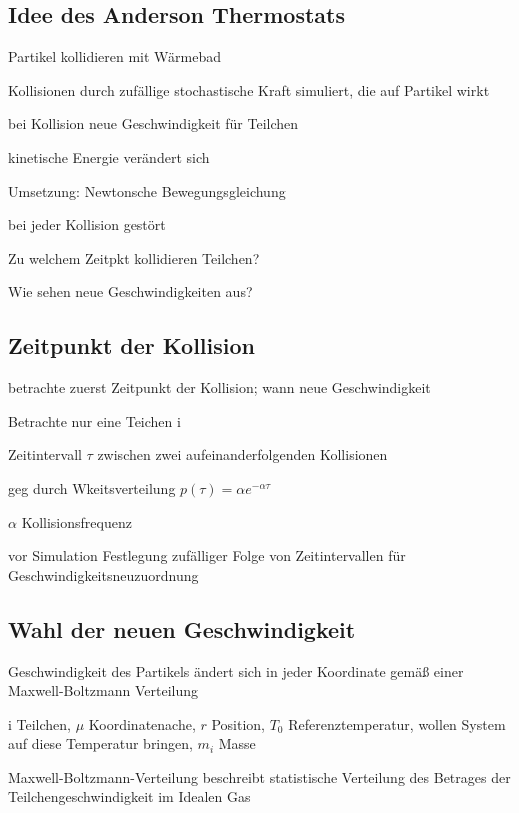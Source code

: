 \documentclass[twocolumn]{article}
\let\tempone\itemize
\let\temptwo\enditemize
\renewenvironment{itemize}{\tempone\addtolength{\itemsep}{-.5\baselineskip}}{\temptwo}
\begin{document}
\subsection{Idee des Anderson Thermostats}
	\begin{itemize}
		\item Partikel kollidieren mit Wärmebad
		\item Kollisionen durch zufällige stochastische Kraft simuliert, die auf Partikel wirkt
		\item bei Kollision neue Geschwindigkeit für Teilchen
		\item kinetische Energie verändert sich
		\item Umsetzung: Newtonsche Bewegungsgleichung
		\item bei jeder Kollision gestört
		\item Zu welchem Zeitpkt kollidieren Teilchen?
		\item Wie sehen neue Geschwindigkeiten aus? 
	\end{itemize}

\subsection{Zeitpunkt der Kollision}
	\begin{itemize}
		\item betrachte zuerst Zeitpunkt der Kollision; wann neue Geschwindigkeit
		\item Betrachte nur eine Teichen i
		\item Zeitintervall $\tau$ zwischen zwei aufeinanderfolgenden Kollisionen
		\item geg durch Wkeitsverteilung $p(\tau)= \alpha e^{- \alpha \tau}$
		\item $\alpha$ Kollisionsfrequenz
		\item  vor Simulation Festlegung zufälliger Folge von Zeitintervallen für Geschwindigkeitsneuzuordnung 
	\end{itemize}

\subsection{Wahl der neuen Geschwindigkeit}
	\begin{itemize}
		\item Geschwindigkeit des Partikels ändert sich in jeder Koordinate gemäß einer Maxwell-Boltzmann Verteilung
		\item i Teilchen, $\mu$ Koordinatenache, $r$ Position, $T_0$ Referenztemperatur, wollen System auf diese Temperatur bringen, $m_i$ Masse 
		\item  Maxwell-Boltzmann-Verteilung beschreibt  statistische Verteilung des Betrages der Teilchengeschwindigkeit im Idealen Gas %
	\end{itemize}
	
\end{document}
